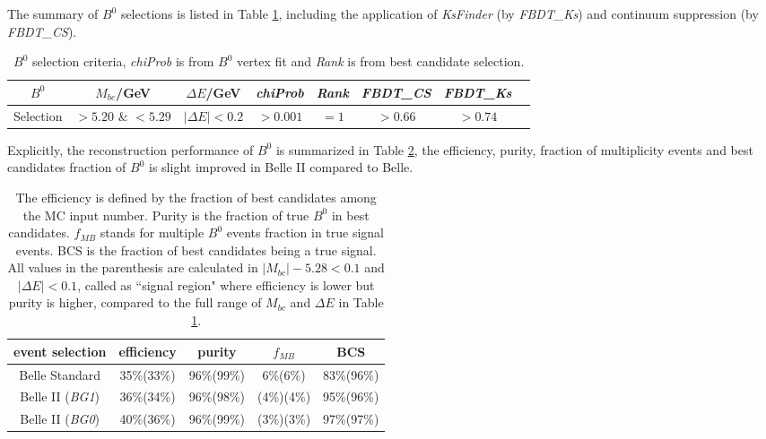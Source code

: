 The summary of $B^0$ selections is listed in Table \ref{tab:b0select}, including the application of \textit{KsFinder} (by \textit{FBDT\_Ks}) and continuum suppression (by \textit{FBDT\_CS}).
\begin{table}[H]
	\centering 
	\begin{tabular}{|c|c|c|c|c|c|c|c|} 
		\hline
		$B^0$  & $M_{bc}$/GeV& $\Delta E$/GeV & \textit{chiProb} & \textit{Rank} & \textit{FBDT\_CS} & \textit{FBDT\_Ks}\\
		\hline
		Selection & $> 5.20$ \& $< 5.29$  &  $ |\Delta E|< 0.2$ & $> 0.001$  & $=1$ & $>0.66$ & $>0.74$\\
		\hline
	\end{tabular}
	\caption{$B^0$ selection criteria, \textit{chiProb} is from $B^0$ vertex fit and \textit{Rank} is from best candidate selection.}
	\label{tab:b0select}
\end{table}

Explicitly, the reconstruction performance of $B^0$ is summarized in Table \ref{tab:b0stats}, the efficiency, purity, fraction of multiplicity events and best candidates fraction of $B^0$ is slight improved in Belle II compared to Belle.
\begin{table}[H]
	\centering
	\begin{tabular}{c|c|c|c|c}
		\hline
		event selection & efficiency & purity  & $f_{MB}$  & BCS \\
		\hline
		\hline
		Belle Standard & 35\%(33\%) & 96\%(99\%) & 6\%(6\%) & 83\%(96\%)\\
		\hline 
		Belle II (\textit{BG1}) & 36\%(34\%) & 96\%(98\%) & (4\%)(4\%) & 95\%(96\%)\\
		\hline
		Belle II (\textit{BG0}) & 40\%(36\%) & 96\%(99\%) & (3\%)(3\%) & 97\%(97\%)\\
		\hline
	\end{tabular}
	\caption{The efficiency is defined by the fraction of best candidates among the MC input number. Purity is the fraction of true $B^0$ in best candidates. $f_{MB}$ stands for multiple $B^0$ events fraction in true signal events. BCS is the fraction of best candidates being a true signal. All values in the parenthesis are calculated in $| M_{bc} |- 5.28 < 0.1$ and $|\Delta E| < 0.1$, called as ``signal region" where efficiency is lower but purity is higher, compared to the full range of $M_{bc}$ and $\Delta E$ in Table \ref{tab:b0select}. }
	\label{tab:b0stats}
\end{table}


